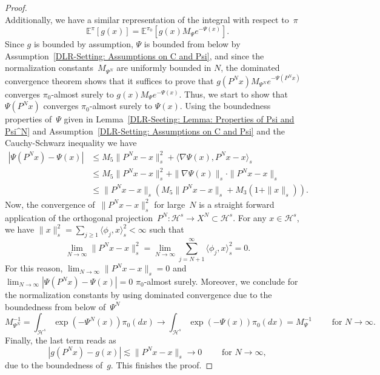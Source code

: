 \begin{proof}
\begin{equation*}
 \end{equation*}
 Additionally, we have a similar representation of the integral with respect to~$\pi$
  \begin{equation*}
   \mathbb{E}^{\pi} [g(x)] = \mathbb{E}^{\pi_0} [g(x)M_{\Psi} e^{-\Psi(x)} ].
 \end{equation*}
  Since $g$ is bounded by assumption, $\Psi$ is bounded from below by Assumption~\ref{DLR-Setting: Assumptions on C and Psi}, and since the normalization constants~$M_{\Psi^N}$ are uniformly bounded in $N$, the dominated convergence theorem shows that it suffices to prove that $g(P^Nx) M_{\Psi^N} e^{-\Psi(P^Nx)}$ converges $\pi_0$-almost surely to $g(x)M_{\Psi} e^{-\Psi(x)}$. Thus, we start to show that $\Psi(P^Nx)$ converges $\pi_0$-almost surely to $\Psi(x)$. Using the boundedness properties of~$\Psi$ given in Lemma~\ref{DLR-Seeting: Lemma: Properties of Psi and Psi^N} and Assumption~\ref{DLR-Setting: Assumptions on C and Psi} and the Cauchy-Schwarz inequality we have
  \begin{align*}
  | \Psi(P^Nx) - \Psi(x) | & \leq  M_5 \| P^Nx -x \|^2_s + \langle \nabla \Psi(x), P^Nx -x \rangle_s \\
  & \leq  M_5 \| P^Nx -x \|^2_s + \| \nabla \Psi(x) \|_s \cdot \|P^Nx -x \|_s \\
  & \leq \| P^Nx -x \|_s ( M_5 \| P^Nx -x \|_s + M_3 (1 + \| x\|_s) ).
  \end{align*}
  Now, the convergence of~$\| P^Nx -x \|^2_s$ for large~$N$ is a straight forward application of the orthogonal projection~$P^N: \mathcal{H}^s \to X^N \subset \mathcal{H}^s$. For any $x \in \mathcal{H}^s$, we have $ \| x \|_s^2 = \sum_{j\geq1} \langle \phi_j, x \rangle_s^2 < \infty $ such that 
  \begin{equation}
    \label{DLR: Lemma Convergence - Projection}
    \lim_{N \to \infty}  \| P^N x - x \|_s^2 = \lim_{N \to \infty} \sum_{j = N +1}^{\infty} \langle \phi_j, x \rangle_s^2 = 0.
  \end{equation}
  For this reason, $\lim_{N \to \infty}  \| P^N x - x \|_s = 0$ and $\lim_{N \to \infty}| \Psi(P^Nx) - \Psi(x) | =0$  $\pi_0$-almost surely.   Moreover, we conclude for the normalization constants by using dominated convergence due to the boundedness from below of~$\Psi^N$
  \begin{equation*}
    M_{\Psi^N}^{-1}  = \int_{\mathcal{H}^s} \exp (-\Psi^N(x)) \pi_0(dx) \longrightarrow \int_{\mathcal{H}^s} \exp (-\Psi(x)) \pi_0(dx) = M_{\Psi}^{-1} \qquad \text{ for } N \to \infty.
  \end{equation*}
  Finally, the last term reads as 
  \begin{equation*}
    |g(P^Nx) - g(x)| \lesssim \|P^Nx-x\|_s \longrightarrow 0 \qquad \text{ for } N \to \infty,
  \end{equation*}
  due to the boundedness of~$g$. This finishes the proof.

\end{proof}

